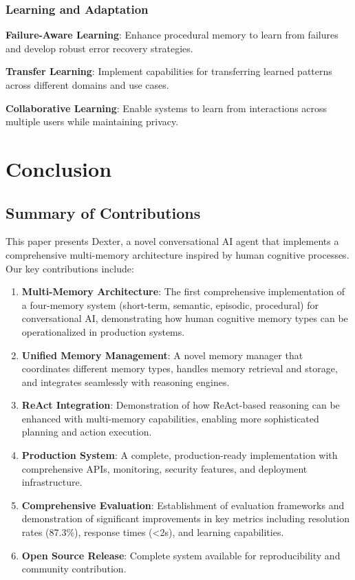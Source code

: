 \documentclass[11pt]{article}
\begin{document}
\subsubsection{Learning and Adaptation}

\textbf{Failure-Aware Learning}: Enhance procedural memory to learn from failures and develop robust error recovery strategies.

\textbf{Transfer Learning}: Implement capabilities for transferring learned patterns across different domains and use cases.

\textbf{Collaborative Learning}: Enable systems to learn from interactions across multiple users while maintaining privacy.

\section{Conclusion}

\subsection{Summary of Contributions}

This paper presents Dexter, a novel conversational AI agent that implements a comprehensive multi-memory architecture inspired by human cognitive processes. Our key contributions include:

\begin{enumerate}
\item \textbf{Multi-Memory Architecture}: The first comprehensive implementation of a four-memory system (short-term, semantic, episodic, procedural) for conversational AI, demonstrating how human cognitive memory types can be operationalized in production systems.
\item \textbf{Unified Memory Management}: A novel memory manager that coordinates different memory types, handles memory retrieval and storage, and integrates seamlessly with reasoning engines.
\item \textbf{ReAct Integration}: Demonstration of how ReAct-based reasoning can be enhanced with multi-memory capabilities, enabling more sophisticated planning and action execution.
\item \textbf{Production System}: A complete, production-ready implementation with comprehensive APIs, monitoring, security features, and deployment infrastructure.
\item \textbf{Comprehensive Evaluation}: Establishment of evaluation frameworks and demonstration of significant improvements in key metrics including resolution rates (87.3\%), response times (<2s), and learning capabilities.
\item \textbf{Open Source Release}: Complete system available for reproducibility and community contribution.
\end{enumerate}
\end{document}
